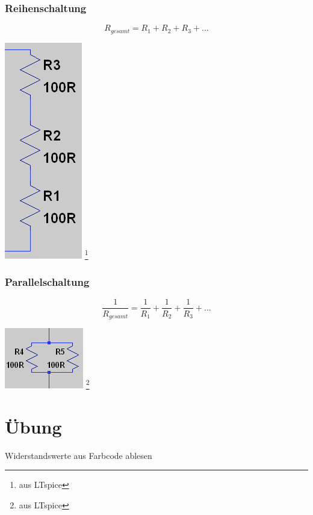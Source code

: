 \begin{frame}
    \frametitle{Reihenschaltung}
        
    $$R_{gesamt} = R_1 + R_2 + R_3 + ...$$

	\begin{center}
        \includegraphics[width=.2\textwidth]{e04/Reihe.png}
        \footnote{\tiny aus LTspice}
    \end{center}
\end{frame}

\begin{frame}
    \frametitle{Parallelschaltung}
        $$\frac{1}{R_{gesamt}} = \frac{1}{R_1} + \frac{1}{R_2} + \frac{1}{R_3} + ...$$
        
	\begin{center}
        \includegraphics[width=.5\textwidth]{e04/Parallel.png}
        \footnote{\tiny aus LTspice}
    \end{center}
    

\end{frame}


\section*{Übung}

\begin{frame}

	\begin{center}
        Widerstandswerte aus Farbcode ablesen
    \end{center}
    
\end{frame}

